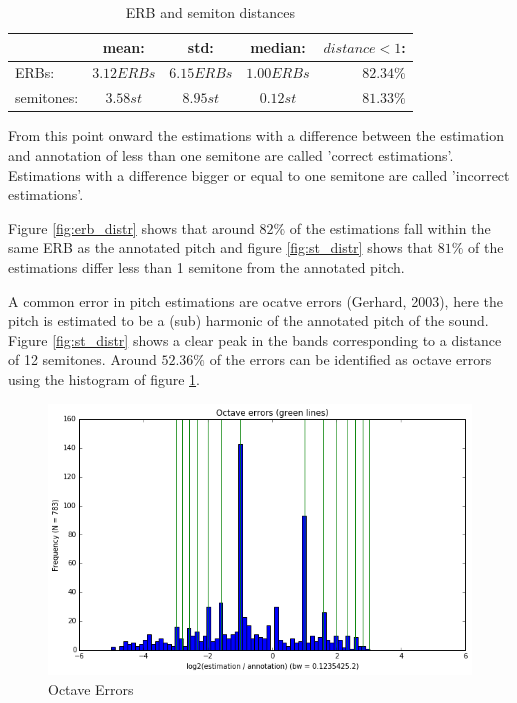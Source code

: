 \documentclass{article}
\begin{document}
\begin{table}[h]
    \begin{center}
        \begin{tabular}{ | l | c | c | c || r |}
            \hline
                        &   mean:       &   std:        &   median:     &   $distance < 1$:\\  \hline
            ERBs:       &   $3.12ERBs$  &   $6.15ERBs$  &   $1.00ERBs$  &   $82.34\%$   \\  \hline
            semitones:  &   $3.58st$    &   $8.95st$    &   $0.12st$    &   $81.33\%$   \\  
            \hline
        \end{tabular}
        \caption{ERB and semiton distances}
        \label{table:ERB_st}
    \end{center}
\end{table}

From this point onward the estimations with a difference between the estimation and annotation of less than one semitone are called 'correct estimations'. Estimations with a difference bigger or equal to one semitone are called 'incorrect estimations'.

Figure \ref{fig:erb_distr} shows that around $82\%$ of the estimations fall within the same ERB as the annotated pitch and figure \ref{fig:st_distr} shows that $81\%$ of the estimations differ less than 1 semitone from the annotated pitch.

A common error in pitch estimations are ocatve errors (Gerhard, 2003), here the pitch is estimated to be a (sub) harmonic of the annotated pitch of the sound. Figure \ref{fig:st_distr} shows a clear peak in the bands corresponding to a distance of 12 semitones. Around $52.36\%$ of the errors can be identified as octave errors using the histogram of figure \ref{fig:octerr1}.

\begin{figure}
    \centering
    \includegraphics[scale=0.5]{img/octerr1.png}
    \caption{Octave Errors}
    \label{fig:octerr1}
\end{figure}
\end{document}
